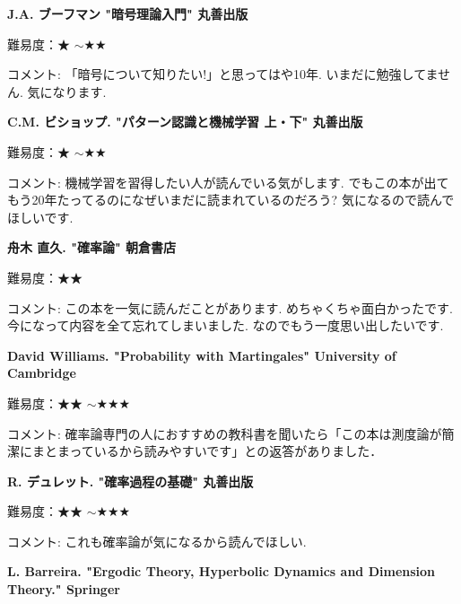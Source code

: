 \textbf{J.A. ブーフマン "暗号理論入門" 丸善出版}  　\vspace{-6pt} 

難易度：★ $\sim$★★\vspace{-6pt} 

コメント: 「暗号について知りたい!」と思ってはや10年. いまだに勉強してません. 気になります. 
\vspace{8pt}


\textbf{C.M. ビショップ. "パターン認識と機械学習 上・下" 丸善出版}  　\vspace{-6pt} 

難易度：★ $\sim$★★\vspace{-6pt} 

コメント: 機械学習を習得したい人が読んでいる気がします. でもこの本が出てもう20年たってるのになぜいまだに読まれているのだろう? 気になるので読んでほしいです. 
\vspace{8pt}

\textbf{舟木 直久. "確率論" 朝倉書店}  　\vspace{-6pt} 

難易度：★★\vspace{-6pt} 

コメント: この本を一気に読んだことがあります. めちゃくちゃ面白かったです. 今になって内容を全て忘れてしまいました. なのでもう一度思い出したいです. 
\vspace{8pt}

\textbf{David Williams. "Probability with Martingales"  University of Cambridge}  　\vspace{-6pt} 

難易度：★★ $\sim$★★★\vspace{-6pt} 

コメント: 確率論専門の人におすすめの教科書を聞いたら「この本は測度論が簡潔にまとまっているから読みやすいです」との返答がありました． 

\vspace{8pt}

\textbf{R. デュレット. "確率過程の基礎" 丸善出版}  　\vspace{-6pt} 

難易度：★★ $\sim$★★★\vspace{-6pt} 

コメント: これも確率論が気になるから読んでほしい. 
\vspace{8pt}

\textbf{L. Barreira. "Ergodic Theory, Hyperbolic Dynamics and Dimension Theory." Springer}　\vspace{-6pt} 

